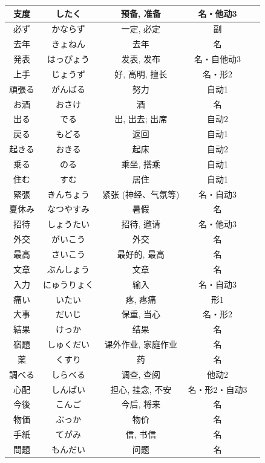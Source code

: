 \begin{longtable}{|c|c|c|c|c|}
支度 & したく & 预备, 准备 & 名・他动3 &  \\ \hline
必ず & かならず & 一定, 必定 & 副 &  \\ \hline
去年 & きょねん & 去年 & 名 &  \\ \hline
発表 & はっぴょう & 发表, 发布 & 名・自他动3 &  \\ \hline
上手 & じょうず & 好, 高明, 擅长 & 名・形2 &  \\ \hline
頑張る & がんばる & 努力 & 自动1 &  \\ \hline
お酒 & おさけ & 酒 & 名 &  \\ \hline
出る & でる & 出, 出去; 出席 & 自动2 &  \\ \hline
戻る & もどる & 返回 & 自动1 &  \\ \hline
起きる & おきる & 起床 & 自动2 &  \\ \hline
乗る & のる & 乘坐, 搭乘 & 自动1 &  \\ \hline
住む & すむ & 居住 & 自动1 &  \\ \hline
緊張 & きんちょう & 紧张 (神经、气氛等) & 名・自动3 &  \\ \hline
夏休み & なつやすみ & 暑假 & 名 &  \\ \hline
招待 & しょうたい & 招待, 邀请 & 名・他动3 &  \\ \hline
外交 & がいこう & 外交 & 名 &  \\ \hline
最高 & さいこう & 最好的, 最高 & 名 &  \\ \hline
文章 & ぶんしょう & 文章 & 名 &  \\ \hline
入力 & にゅうりょく & 输入 & 名・自动3 &  \\ \hline
痛い & いたい & 疼, 疼痛 & 形1 &  \\ \hline
大事 & だいじ & 保重, 当心 & 名・形2 &  \\ \hline
結果 & けっか & 结果 & 名 &  \\ \hline
宿題 & しゅくだい & 课外作业, 家庭作业 & 名 &  \\ \hline
薬 & くすり & 药 & 名 &  \\ \hline
調べる & しらべる & 调查, 查阅 & 他动2 &  \\ \hline
心配 & しんぱい & 担心, 挂念, 不安 & 名・形2・自动3 &  \\ \hline
今後 & こんご & 今后, 将来 & 名 &  \\ \hline
物価 & ぶっか & 物价 & 名 &  \\ \hline
手紙 & てがみ & 信, 书信 & 名 &  \\ \hline
問題 & もんだい & 问题 & 名 &  \\ \hline

\end{longtable}
